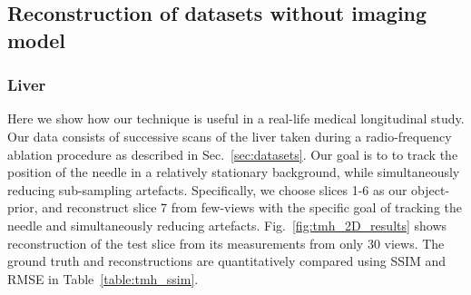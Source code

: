 \documentclass[journal]{IEEEtran}
\begin{document}
\subsection{Reconstruction of datasets without imaging model}
\label{sec:results_without_imaging_model}
\subsubsection{\textbf{Liver}}
\label{sec:tmh}

Here we show how our technique is useful in a
real-life medical longitudinal study. Our data consists of
successive scans of the liver taken during a radio-frequency ablation
procedure as described in Sec.~\ref{sec:datasets}. Our goal is to to
track the position of the needle in a relatively stationary
background, while simultaneously reducing sub-sampling artefacts.
Specifically, we choose slices 1-6 as our object-prior, and
reconstruct slice 7 from few-views with the specific goal of tracking
the needle and simultaneously reducing
artefacts. Fig.~\ref{fig:tmh_2D_results} 
shows reconstruction of the test
slice from its measurements from only 30 views. 
The ground truth and reconstructions 
are quantitatively compared using
SSIM and RMSE in Table~\ref{table:tmh_ssim}.
\end{document}
